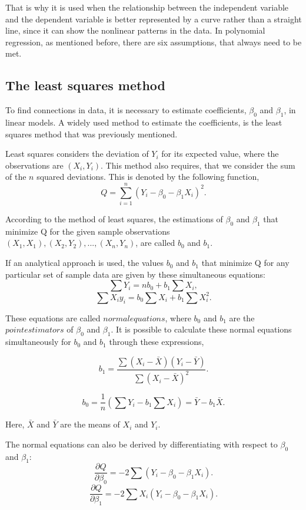 That is why it is used when the relationship between the independent variable and the dependent variable is better represented by a curve rather than a straight line, since it can show the nonlinear patterns in the data.
In polynomial regression, as mentioned before, there are six assumptions, that always need to be met.

\subsection{The least squares method}
	To find connections in data, it is necessary to estimate coefficients, $\beta_0$ and $\beta_1$, in linear models. 
	A widely used method to estimate the coefficients, is the least squares method that was previously mentioned. 
	
	Least squares considers the deviation of $Y_i$ for  its expected value, where the observations are $(X_i, Y_i)$. 
	This method also requires, that we consider the sum of the $n$ squared deviations.
	This is denoted by the following function,
	$$Q=\sum_{i=1}^{n}(Y_i-\beta_0 - \beta_1 X_i)^2.$$	
	
	According to the method of least squares, the estimations of $\beta_0$ and $\beta_1$ that minimize Q for the given sample observations $(X_1,X_1), (X_2,Y_2), ..., (X_n,Y_n)$, are called $b_0$ and $b_1$.  
	
	If an analytical approach is used, the values $b_0$ and $b_1$ that minimize Q for any particular set of sample data are given by these simultaneous equations: 
	$$\sum Y_i =n b_0 +b_1 \sum X_i,$$
	$$\sum X_i y_i = b_0 \sum X_i + b_1 \sum X_i^2.$$
	
	These equations are called $normal  equations$, where $b_0$ and $b_1$ are the $point estimators$ of $\beta_0$ and $\beta_1$. It is possible to calculate these normal equations simultaneously for $b_0$ and $b_1$ through these expressions,
	
	$$b_1 = \frac{\sum (X_i - \bar{X}) (Y_i - \bar{Y})}{\sum (X_i - \bar{X})^2} .$$
	
	$$b_0 = \frac{1}{n} (\sum Y_i - b_1 \sum X_i ) = \bar{Y} - b_1 \bar{X}.$$
	
	Here, $\bar{X}$ and $\bar{Y}$ are the means of $X_i$ and $Y_i$.
	
	The normal equations can also be derived by differentiating with respect to $\beta_0$ and $\beta_1$:
	$$\frac{\partial Q}{\partial \beta_0}=-2 \sum (Y_i - \beta_0 - \beta_1 X_i).$$
	$$\frac{\partial Q} {\partial \beta_1} = -2 \sum X_i (Y_i - \beta_0 - \beta_1 X_i).$$
	
